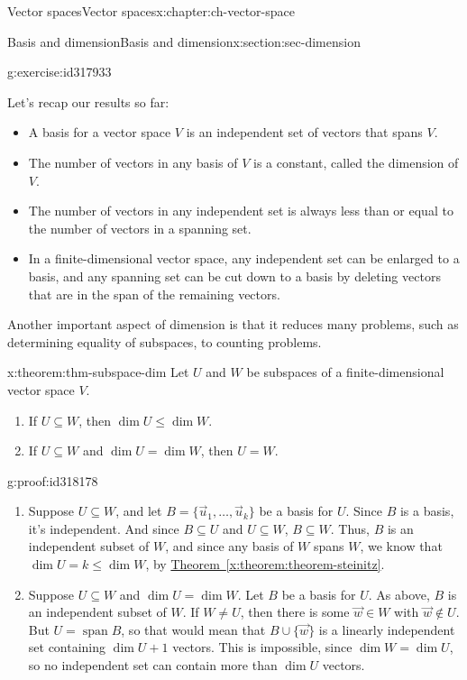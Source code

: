 \documentclass[oneside,10pt,]{book}
\numberwithin{equation}{section}
\newcommand{\spn}{\operatorname{span}}
\begin{document}
\begin{chapterptx}{Vector spaces}{}{Vector spaces}{}{}{x:chapter:ch-vector-space}
\begin{sectionptx}{Basis and dimension}{}{Basis and dimension}{}{}{x:section:sec-dimension}
\begin{inlineexercise}{}{g:exercise:id317933}
\end{inlineexercise}
Let's recap our results so far:%
\begin{itemize}[label=\textbullet]
\item{}A basis for a vector space \(V\) is an independent set of vectors that spans \(V\).%
\item{}The number of vectors in any basis of \(V\) is a constant, called the dimension of \(V\).%
\item{}The number of vectors in any independent set is always less than or equal to the number of vectors in a spanning set.%
\item{}In a finite-dimensional vector space, any independent set can be enlarged to a basis, and any spanning set can be cut down to a basis by deleting vectors that are in the span of the remaining vectors.%
\end{itemize}
Another important aspect of dimension is that it reduces many problems, such as determining equality of subspaces, to counting problems.%
\begin{theorem}{}{}{x:theorem:thm-subspace-dim}%
Let \(U\) and \(W\) be subspaces of a finite-dimensional vector space \(V\).%
\begin{enumerate}
\item{}If \(U\subseteq W\), then \(\dim U\leq \dim W\).%
\item{}If \(U\subseteq W\) and \(\dim U=\dim W\), then \(U=W\).%
\end{enumerate}
%
\end{theorem}
\begin{proofptx}{}{g:proof:id318178}
%
\begin{enumerate}
\item{}Suppose \(U\subseteq W\), and let \(B=\{\vec{u}_1,\ldots, \vec{u}_k\}\) be a basis for \(U\). Since \(B\) is a basis, it's independent. And since \(B\subseteq U\) and \(U\subseteq W\), \(B\subseteq W\). Thus, \(B\) is an independent subset of \(W\), and since any basis of \(W\) spans \(W\), we know that \(\dim U = k \leq \dim W\), by \hyperref[x:theorem:theorem-steinitz]{Theorem~\ref{x:theorem:theorem-steinitz}}.%
\item{}Suppose \(U\subseteq W\) and \(\dim U = \dim W\). Let \(B\) be a basis for \(U\). As above, \(B\) is an independent subset of \(W\). If \(W\neq U\), then there is some \(\vec{w}\in W\) with \(\vec{w}\notin U\). But \(U=\spn B\), so that would mean that \(B\cup \{\vec{w}\}\) is a linearly independent set containing \(\dim U+1\) vectors. This is impossible, since \(\dim W=\dim U\), so no independent set can contain more than \(\dim U\) vectors.%

\end{enumerate}
\end{proofptx}
\end{sectionptx}
\end{chapterptx}
\end{document}
